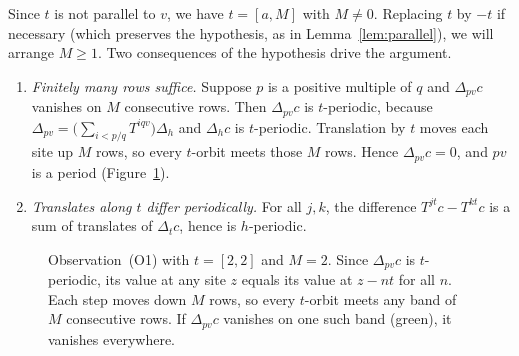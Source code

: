 \documentclass[11pt,a4paper,reqno]{amsart}
\theoremstyle{definition}
\theoremstyle{remark}
\newcommand{\De}{\Delta}
\newcommand{\rc}[2]{[#1,#2]}
\numberwithin{equation}{section}
\begin{document}
Since $t$ is not parallel to $v$, we have $t=\rc aM$ with $M\ne0$. Replacing $t$ by $-t$ if necessary (which preserves the hypothesis, as in Lemma~\ref{lem:parallel}), we will arrange $M\ge1$. Two consequences of the hypothesis drive the argument.
\begin{enumerate}
\item[(O1)] \emph{Finitely many rows suffice.} Suppose $p$ is a positive multiple of $q$ and $\De_{pv}c$ vanishes on $M$ consecutive rows. Then $\De_{pv}c$ is $t$-periodic, because $\De_{pv}=\bigl(\sum_{i<p/q}T^{iqv}\bigr)\De_h$ and $\De_hc$ is $t$-periodic. Translation by $t$ moves each site up $M$ rows, so every $t$-orbit meets those $M$ rows. Hence $\De_{pv}c=0$, and $pv$ is a period (Figure~\ref{fig:O1}).
\item[(O2)] \emph{Translates along $t$ differ periodically.} For all $j,k$, the difference $T^{jt}c-T^{kt}c$ is a sum of translates of $\De_tc$, hence is $h$-periodic.
\end{enumerate}
\begin{figure}[ht]
\centering
{}
\caption{Observation~(O1) with $t=\rc2 2$ and $M=2$. Since $\De_{pv}c$ is $t$-periodic, its value at any site $z$ equals its value at $z-nt$ for all $n$. Each step moves down $M$ rows, so every $t$-orbit meets any band of $M$ consecutive rows. If $\De_{pv}c$ vanishes on one such band (green), it vanishes everywhere.}
\label{fig:O1}
\end{figure}
\end{document}
